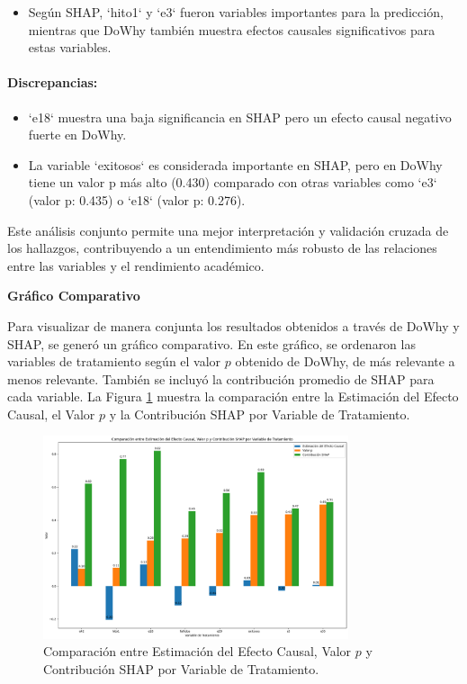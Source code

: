 \begin{itemize}
    \item Según SHAP, `hito1` y `e3` fueron variables importantes para la predicción, mientras que DoWhy también muestra efectos causales significativos para estas variables.
\end{itemize}

\paragraph{Discrepancias:}

\begin{itemize}
    \item `e18` muestra una baja significancia en SHAP pero un efecto causal negativo fuerte en DoWhy.
    \item La variable `exitosos` es considerada importante en SHAP, pero en DoWhy tiene un valor p más alto (0.430) comparado con otras variables como `e3` (valor p: 0.435) o `e18` (valor p: 0.276).
\end{itemize}

Este análisis conjunto permite una mejor interpretación y validación cruzada de los hallazgos, contribuyendo a un entendimiento más robusto de las relaciones entre las variables y el rendimiento académico.

\textbf{Gráfico Comparativo}

Para visualizar de manera conjunta los resultados obtenidos a través de DoWhy y SHAP, se generó un gráfico comparativo. En este gráfico, se ordenaron las variables de tratamiento según el valor \( p \) obtenido de DoWhy, de más relevante a menos relevante. También se incluyó la contribución promedio de SHAP para cada variable. La Figura \ref{fig:grafico_comparativo_dowhy_shap} muestra la comparación entre la Estimación del Efecto Causal, el Valor \( p \) y la Contribución SHAP por Variable de Tratamiento.

\begin{figure}[H]
    \centering
    \includegraphics[width=0.8\textwidth]{img/causalidad/grafico_resultados_variables_compara_shap.png}
    \caption{Comparación entre Estimación del Efecto Causal, Valor \( p \) y Contribución SHAP por Variable de Tratamiento.}
    \label{fig:grafico_comparativo_dowhy_shap}
\end{figure}

